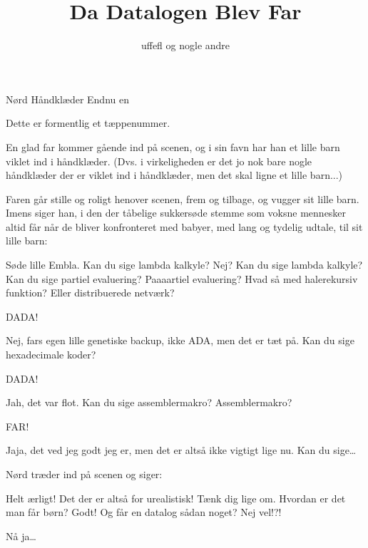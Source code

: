 \documentclass[danish]{article}
\title{Da Datalogen Blev Far}
\author{uffefl og nogle andre}
\begin{document}
\maketitle

\begin{roles}
   Nørd
   Håndklæder
   Endnu en
\end{roles}

\begin{sketch}

\scene Dette er formentlig et tæppenummer.

En glad far kommer gående ind på scenen, og i sin favn har han et lille barn
viklet ind i håndklæder. (Dvs. i virkeligheden er det jo nok bare nogle
håndklæder der er viklet ind i håndklæder, men det skal ligne et lille barn...)

Faren går stille og roligt henover scenen, frem og tilbage, og vugger sit lille
barn. Imens siger han, i den der tåbelige sukkersøde stemme som voksne mennesker
altid får når de bliver konfronteret med babyer, med lang og tydelig udtale, til
sit lille barn:

 Søde lille Embla. Kan du sige lambda kalkyle? Nej? Kan du sige lambda
kalkyle? Kan du sige partiel evaluering? Paaaartiel evaluering? Hvad så med
halerekursiv funktion? Eller distribuerede netværk?

 DADA!

 Nej, fars egen lille genetiske backup, ikke ADA, men det er tæt på. Kan du
sige hexadecimale koder?

 DADA!

 Jah, det var flot. Kan du sige assemblermakro? Assemblermakro?

 FAR!

 Jaja, det ved jeg godt jeg er, men det er altså ikke vigtigt lige nu. Kan
du sige\ldots{}

\scene Nørd træder ind på scenen og siger:

 Helt ærligt! Det der er altså for urealistisk! Tænk dig lige om.
Hvordan er det man får børn? Godt! Og får en datalog sådan noget? Nej vel!?!

 Nå ja\ldots{} 

\end{sketch}
\end{document}
